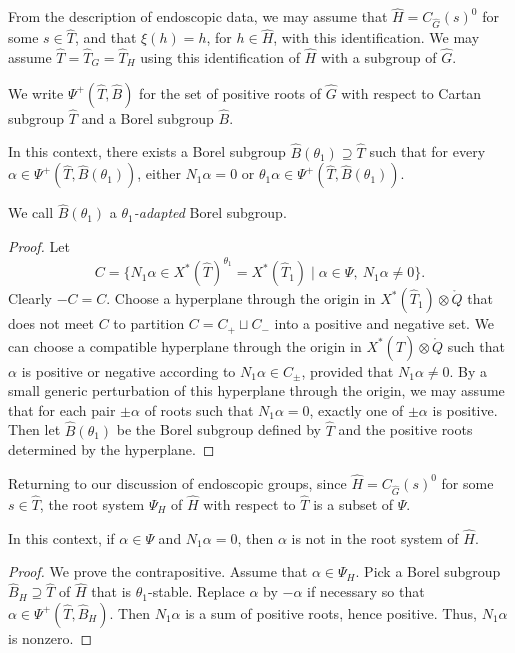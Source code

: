 From the description of endoscopic data, we may assume that $\hat H =
C_{\hat G}(s)^0$ for some $s\in \hat T$, and that $\xi(h) = h$, for $h
\in \hat H$, with this identification.  We may assume $\hat T = \hat
T_G = \hat T_H$ using this identification of $\hat H$ with a subgroup
of $\hat G$.

We write $\Psi^+(\hat T,\hat B)$ for the set of positive roots of $\hat G$ with respect
to Cartan subgroup $\hat T$ and a Borel subgroup $\hat B$.

\begin{lemma} In this context, there exists a Borel subgroup $\hat B(\theta_1)\supseteq \hat T$
such that for every $\alpha\in\Psi^+(\hat T,\hat B(\theta_1))$, either
$N_1\alpha = 0$ or $\theta_1\alpha\in \Psi^+(\hat T,\hat B(\theta_1))$.
\end{lemma}

We call $\hat B(\theta_1)$ a {\it $\theta_1$-adapted}  Borel subgroup.

\begin{proof}  Let 
\[
C = \{N_1\alpha\in X^*(\hat T)^{\theta_1}=X^*(\hat T_1) \mid \alpha\in\Psi,\ N_1\alpha\ne 0\}.
\]
Clearly  $-C = C$.   Choose a hyperplane through the origin in $X^*(\hat T_1)\otimes\ring{Q}$
that does not meet $C$ to partition $C = C_+ \sqcup C_-$ into a positive and negative set.
We can choose a compatible hyperplane through the origin in $X^*(\hat T)\otimes\ring{Q}$
such that $\alpha$ is positive or negative according to $N_1\alpha\in C_\pm$, provided
that $N_1\alpha\ne 0$.  By a small generic perturbation of this hyperplane through the origin,
we may assume that for each pair $\pm\alpha$ of roots such that $N_1\alpha=0$,
exactly one of $\pm\alpha$ is positive.  Then let $\hat B(\theta_1)$ be the Borel
subgroup defined by $\hat T$ and the positive roots determined by the hyperplane.
\end{proof}

Returning to our discussion of endoscopic groups,
since $\hat H = C_{\hat G}(s)^0$ for some $s\in \hat T$, the root system $\Psi_H$
of $\hat H$
with respect to $\hat T$ is a subset of $\Psi$.

\begin{lemma} In this context,  if $\alpha\in \Psi$ and  $N_1\alpha=0$, then
$\alpha$ is not in the root system of $\hat H$.
\end{lemma}

\begin{proof} We prove the contrapositive.  Assume that $\alpha\in\Psi_H$.
Pick a Borel subgroup $\hat B_H\supseteq \hat T$ of $\hat H$ that
is $\theta_1$-stable.  Replace $\alpha$ by $-\alpha$ if necessary so that 
$\alpha\in\Psi^+(\hat T,\hat B_H)$.  Then $N_1\alpha$ is a sum of positive roots,
hence positive.  Thus, $N_1\alpha$ is nonzero.
\end{proof}

